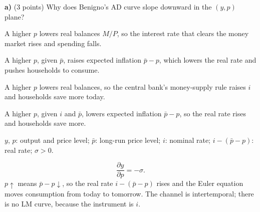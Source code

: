 \textbf{a)} (3 points) Why does Benigno's AD curve slope downward in the $(y,p)$ plane?
\begin{alternativas}
\item A higher $p$ lowers real balances $M/P$, so the interest rate that clears the money market rises and spending falls.
\item A higher $p$, given $\bar p$, raises expected inflation $\bar p-p$, which lowers the real rate and pushes households to consume.
\item A higher $p$ lowers real balances, so the central bank's money-supply rule raises $i$ and households save more today.
\item A higher $p$, given $i$ and $\bar p$, lowers expected inflation $\bar p-p$, so the real rate rises and households save more.
\end{alternativas}
\begin{sol}
\begin{notacao}
\item $y$, $p$: output and price level; $\bar p$: long-run price level; $i$: nominal rate; $i-(\bar p-p)$: real rate; $\sigma>0$.
\end{notacao}
\begin{equation}
\frac{\partial y}{\partial p}=-\sigma. \label{b8q22:slope}
\end{equation}
$p\uparrow$ means $\bar p-p\downarrow$, so the real rate $i-(\bar p-p)$ rises and the Euler equation moves consumption from today to
tomorrow. The channel is intertemporal; there is no LM curve, because the instrument is $i$.
\end{sol}

